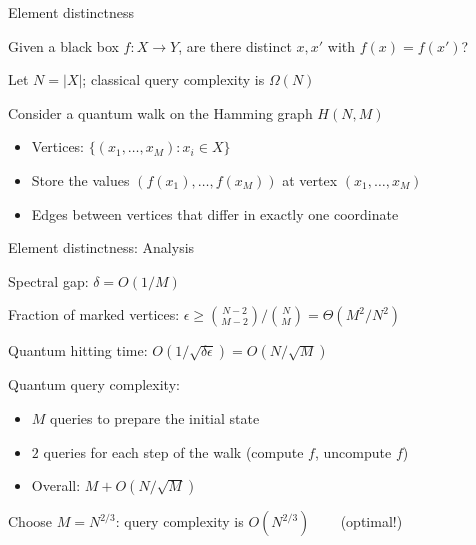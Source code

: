 
\begin{frame}{Element distinctness}

\begin{problem}
Given a black box $f:X \to Y$, are there distinct $x,x'$ with $f(x)=f(x')$?
\end{problem}

\pause
\bigskip

Let $N=|X|$; classical query complexity is $\Omega(N)$

\pause
\bigskip

Consider a quantum walk on the Hamming graph $H(N,M)$ \pause
\begin{itemize}
  \item<+-> Vertices: $\{(x_1,\ldots,x_M): x_i \in X\}$
  \item<+-> Store the values $(f(x_1),\ldots,f(x_M))$ at vertex $(x_1,\ldots,x_M)$
  \item<+-> Edges between vertices that differ in exactly one coordinate
\end{itemize}

\end{frame}


\begin{frame}{Element distinctness: Analysis}
  
Spectral gap: $\delta = O(1/M)$

\pause
\bigskip

Fraction of marked vertices: $\epsilon \ge \binom{N-2}{M-2}/\binom{N}{M} = \Theta(M^2/N^2)$

\pause
\bigskip

Quantum hitting time: $O(1/\sqrt{\delta\epsilon}) = O(N/\sqrt M)$

\pause
\bigskip

Quantum query complexity: \pause
\begin{itemize}
  \item<+-> $M$ queries to prepare the initial state
  \item<+-> $2$ queries for each step of the walk (compute $f$, uncompute $f$)
  \item<+-> Overall: $M + O(N/\sqrt M)$
\end{itemize}

\bigskip

Choose $M=N^{2/3}$: query complexity is $O(N^{2/3})$ ~~~ (optimal!)

\end{frame}

